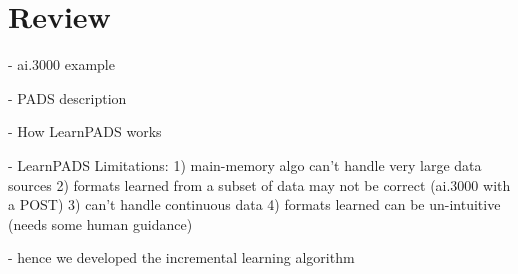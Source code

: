 \section{Review} 
\label{sec:review}

 - ai.3000 example

 - PADS description

 - How LearnPADS works

 - LearnPADS Limitations: 
	1) main-memory algo can't handle very large data sources
        2) formats learned from a subset of data may not be correct (ai.3000 with a POST)
	3) can't handle continuous data
	4) formats learned can be un-intuitive (needs some human guidance)

 - hence we developed the incremental learning algorithm
